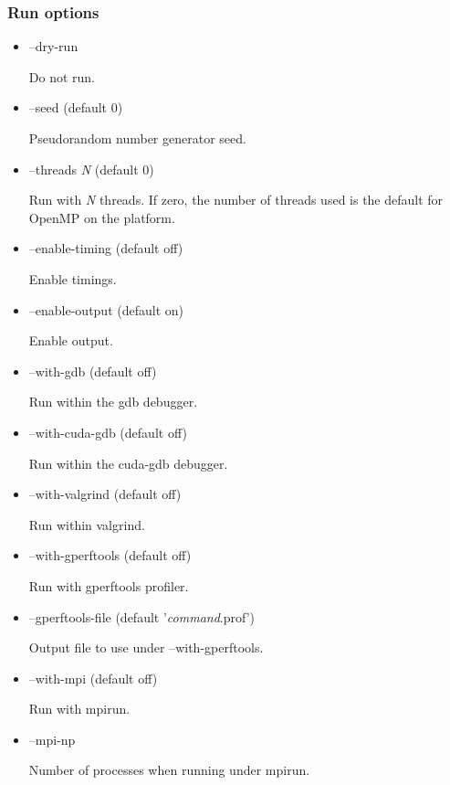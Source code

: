 \subsubsection{Run options}
\begin{itemize}
\item {\sf --dry-run}

Do not run.

\item {\sf --seed} (default 0)

Pseudorandom number generator seed.

\item {\sf --threads \textsl{N}} (default 0)

Run with {\sf \textsl{N}} threads. If zero, the number of threads used is the
default for OpenMP on the platform.

\item {\sf --enable-timing} (default off)

Enable timings.

\item {\sf --enable-output} (default on)

Enable output.

\item {\sf --with-gdb} (default off)

Run within the {\sf gdb} debugger.

\item {\sf --with-cuda-gdb} (default off)

Run within the {\sf cuda-gdb} debugger.

\item {\sf --with-valgrind} (default off)

Run within {\sf valgrind}.

\item {\sf --with-gperftools} (default off)

Run with {\sf gperftools} profiler.

\item {\sf --gperftools-file} (default '\textsl{command}.prof')

Output file to use under {\sf --with-gperftools}.

\item {\sf --with-mpi} (default off)

Run with {\sf mpirun}.

\item {\sf --mpi-np}

Number of processes when running under {\sf mpirun}.

\end{itemize}


